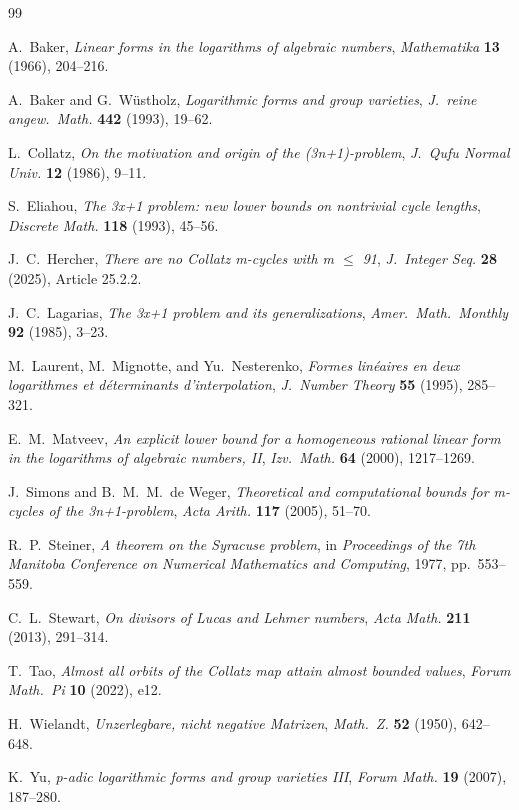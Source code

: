 \documentclass[12pt,a4paper]{amsart}
\theoremstyle{plain}
\theoremstyle{definition}
\begin{document}
\begin{thebibliography}{99}

A.~Baker, \emph{Linear forms in the logarithms of algebraic numbers}, \emph{Mathematika} \textbf{13} (1966), 204--216.

A.~Baker and G.~Wüstholz, \emph{Logarithmic forms and group varieties}, \emph{J.~reine angew.~Math.} \textbf{442} (1993), 19--62.

L.~Collatz, \emph{On the motivation and origin of the (3n+1)-problem}, \emph{J.~Qufu Normal Univ.} \textbf{12} (1986), 9--11.

S.~Eliahou, \emph{The 3x+1 problem: new lower bounds on nontrivial cycle lengths}, \emph{Discrete Math.} \textbf{118} (1993), 45--56.

J.~C.~Hercher, \emph{There are no Collatz m-cycles with m $\leq$ 91}, \emph{J.~Integer Seq.} \textbf{28} (2025), Article 25.2.2.

J.~C.~Lagarias, \emph{The 3x+1 problem and its generalizations}, \emph{Amer.~Math.~Monthly} \textbf{92} (1985), 3--23.

M.~Laurent, M.~Mignotte, and Yu.~Nesterenko, \emph{Formes linéaires en deux logarithmes et déterminants d'interpolation}, \emph{J.~Number Theory} \textbf{55} (1995), 285--321.

E.~M.~Matveev, \emph{An explicit lower bound for a homogeneous rational linear form in the logarithms of algebraic numbers, II}, \emph{Izv.~Math.} \textbf{64} (2000), 1217--1269.

J.~Simons and B.~M.~M.~de Weger, \emph{Theoretical and computational bounds for m-cycles of the 3n+1-problem}, \emph{Acta Arith.} \textbf{117} (2005), 51--70.

R.~P.~Steiner, \emph{A theorem on the Syracuse problem}, in \emph{Proceedings of the 7th Manitoba Conference on Numerical Mathematics and Computing}, 1977, pp.~553--559.

C.~L.~Stewart, \emph{On divisors of Lucas and Lehmer numbers}, \emph{Acta Math.} \textbf{211} (2013), 291--314.

T.~Tao, \emph{Almost all orbits of the Collatz map attain almost bounded values}, \emph{Forum Math.~Pi} \textbf{10} (2022), e12.

H.~Wielandt, \emph{Unzerlegbare, nicht negative Matrizen}, \emph{Math.~Z.} \textbf{52} (1950), 642--648.

K.~Yu, \emph{p-adic logarithmic forms and group varieties III}, \emph{Forum Math.} \textbf{19} (2007), 187--280.

\end{thebibliography}
\end{document}
